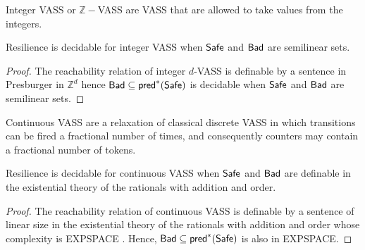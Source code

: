 Integer VASS or $\mathbb{Z}-$VASS \cite{DBLP:conf/rp/HaaseH14} are VASS that are allowed to take values from the integers.

\begin{theorem}{}
Resilience is decidable for integer VASS when $\textsf{Safe}$ and $\textsf{Bad}$ are semilinear sets.
\end{theorem}

\begin{proof}
The reachability relation of integer $d$-VASS is definable by a sentence in Presburger in $\mathbb{Z}^d$ hence	$\textsf{Bad} \subseteq \textsf{pred}^*(\textsf{Safe})$ is decidable when $\textsf{Safe}$ and $\textsf{Bad}$ are semilinear sets. 	
\end{proof}

Continuous VASS \cite{DBLP:journals/tocl/BlondinFHH17} are a relaxation of classical discrete VASS in which transitions can be fired a fractional number of times, and consequently counters may contain a fractional number of tokens.

\begin{theorem}{}
Resilience is decidable for continuous VASS when $\textsf{Safe}$ and $\textsf{Bad}$ are definable in the existential theory of
the rationals with addition and order.
\end{theorem}

\begin{proof}
The reachability relation of continuous VASS is definable by a sentence of linear size in the existential theory of
the rationals with addition and order whose complexity is EXPSPACE \cite{DBLP:journals/tocl/BlondinFHH17}. Hence, $\textsf{Bad} \subseteq \textsf{pred}^*(\textsf{Safe})$ is also in EXPSPACE. 
\end{proof}


